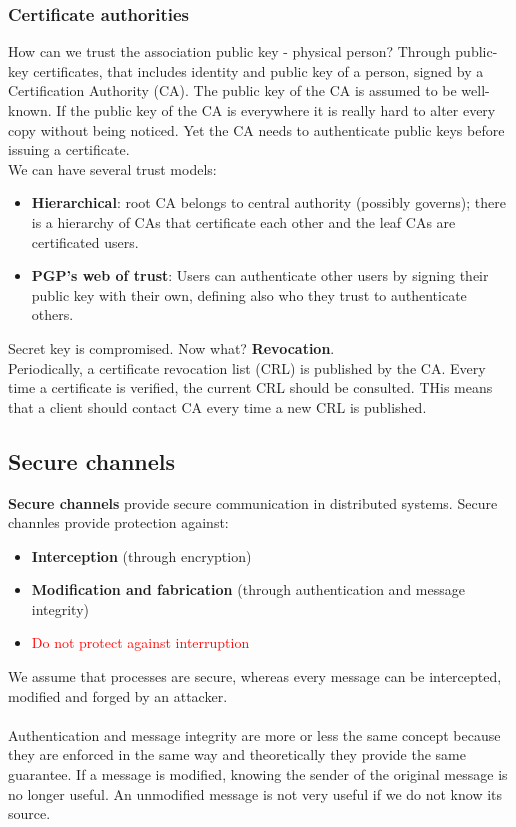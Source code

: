 \documentclass[10pt,a4paper]{article}
\begin{document}
\subsubsection{Certificate authorities}
How can we trust the association public key - physical person? Through public-key certificates, that includes identity and public key of a person, signed by a Certification Authority (CA). The public key of the CA is assumed to be well-known. If the public key of the CA is everywhere it is really hard to alter every copy without being noticed. Yet the CA needs to authenticate public keys before issuing a certificate. \\
We can have several trust models:
\begin{itemize}
	\item \textbf{Hierarchical}: root CA belongs to central authority (possibly governs); there is a hierarchy of CAs that certificate each other and the leaf CAs are certificated users.
	\item \textbf{PGP's web of trust}: Users can authenticate other users by signing their public key with their own, defining also who they trust to authenticate others.
\end{itemize}
Secret key is compromised. Now what? \textbf{Revocation}. \\
Periodically, a certificate revocation list (CRL) is published by the CA. Every time a certificate is verified, the current CRL should be consulted. THis means that a client should contact CA every time a new CRL is published.
\subsection{Secure channels}
\textbf{Secure channels} provide secure communication in distributed systems. Secure channles provide protection against:
\begin{itemize}
	\item \textbf{Interception} (through encryption)
	\item \textbf{Modification and fabrication} (through authentication and message integrity)
	\item \textcolor{Red}{Do not protect against interruption}
\end{itemize}
We assume that processes are secure, whereas every message can be intercepted, modified and forged by an attacker. \\ \\
Authentication and message integrity are more or less the same concept because they are enforced in the same way and theoretically they provide the same guarantee. If a message is modified, knowing the sender of the original message is no longer useful. An unmodified message is not very useful if we do not know its source. 
\end{document}
